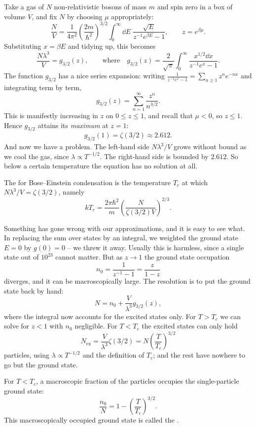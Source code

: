 Take a gas of $N$ non-relativistic bosons of mass $m$ and spin zero in a box of volume $V$, and fix $N$ by choosing $\mu$ appropriately:
$$
\frac NV = \frac{1}{4\pi^2}\left(\frac{2m}{\hbar^2}\right)^{3/2}\int_0^\infty \dd E\; \frac{\sqrt E}{z^{-1}e^{\beta E}-1}, \qquad z = e^{\beta\mu}.
$$
Substituting $x = \beta E$ and tidying up, this becomes
$$
\frac{N\lambda^3}{V} = g_{3/2}(z), \qquad \text{where} \quad g_{3/2}(z) = \frac{2}{\sqrt\pi}\int_0^\infty \frac{x^{1/2}\dd x}{z^{-1}e^x - 1}.
$$
The function $g_{3/2}$ has a nice series expansion: writing $\frac{1}{z^{-1}e^x-1} = \sum_{n\ge 1}z^n e^{-nx}$ and integrating term by term,
$$
g_{3/2}(z) = \sum_{n=1}^\infty \frac{z^n}{n^{3/2}}.
$$
This is manifestly increasing in $z$ on $0 \le z \le 1$, and recall that $\mu < 0$, so $z \le 1$. Hence $g_{3/2}$ attains its \emph{maximum} at $z = 1$:
$$
g_{3/2}(1) = \zeta(3/2) \approx 2.612.
$$
And now we have a problem. The left-hand side $N\lambda^3/V$ grows without bound as we cool the gas, since $\lambda \propto T^{-1/2}$. The right-hand side is bounded by $2.612$. So below a certain temperature the equation has no solution at all.

\begin{definition}
	The  for Bose--Einstein condensation is the temperature $T_c$ at which $N\lambda^3/V = \zeta(3/2)$, namely
	$$
	kT_c = \frac{2\pi\hbar^2}{m}\left(\frac{N}{\zeta(3/2)V}\right)^{2/3}.
	$$
\end{definition}

Something has gone wrong with our approximations, and it is easy to see what. In replacing the sum over states by an integral, we weighted the ground state $E=0$ by $g(0) = 0$ -- we threw it away. Usually this is harmless, since a single state out of $10^{23}$ cannot matter. But as $z \to 1$ the ground state occupation
$$
n_0 = \frac{1}{z^{-1}-1} = \frac{z}{1-z}
$$
diverges, and it can be macroscopically large. The resolution is to put the ground state back by hand:
$$
N = n_0 + \frac{V}{\lambda^3}g_{3/2}(z),
$$
where the integral now accounts for the excited states only. For $T > T_c$ we can solve for $z < 1$ with $n_0$ negligible. For $T < T_c$ the excited states can only hold
$$
N_{\mathrm{ex}} = \frac{V}{\lambda^3}\zeta(3/2) = N\left(\frac{T}{T_c}\right)^{3/2}
$$
particles, using $\lambda \propto T^{-1/2}$ and the definition of $T_c$; and the rest have nowhere to go but the ground state.

\begin{proposition}
	For $T < T_c$, a macroscopic fraction of the particles occupies the single-particle ground state:
	$$
	\frac{n_0}{N} = 1 - \left(\frac{T}{T_c}\right)^{3/2}.
	$$
	This macroscopically occupied ground state is called the .
\end{proposition}

